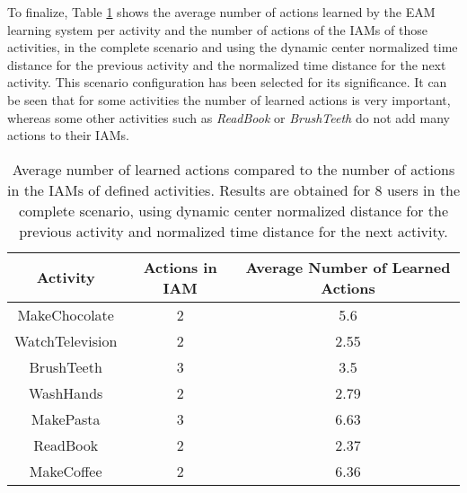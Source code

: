 To finalize, Table \ref{tab-avg-actions-comp-t2} shows the average number of actions learned by the EAM learning system per activity and the number of actions of the IAMs of those activities, in the complete scenario and using the dynamic center normalized time distance for the previous activity and the normalized time distance for the next activity. This scenario configuration has been selected for its significance. It can be seen that for some activities the number of learned actions is very important, whereas some other activities such as \textit{ReadBook} or \textit{BrushTeeth} do not add many actions to their IAMs.

\begin{table}[htbp]\scriptsize
  \begin{center}
        \begin{tabular}{ccc}
            \hline            
            \textbf{Activity} & \textbf{Actions in IAM} & \textbf{Average Number of Learned Actions} \\             
            \hline
            MakeChocolate   & 2 & 5.6 \\
	    WatchTelevision & 2 & 2.55 \\
	    BrushTeeth      & 3 & 3.5 \\
	    WashHands       & 2 & 2.79 \\
	    MakePasta       & 3 & 6.63 \\
	    ReadBook        & 2 & 2.37 \\
	    MakeCoffee      & 2 & 6.36 \\
            \hline
        \end{tabular}                
        \caption{Average number of learned actions compared to the number of actions in the IAMs of defined activities. Results are obtained for 8 users in the complete scenario, using dynamic center normalized distance for the previous activity and normalized time distance for the next activity.}
        \label{tab-avg-actions-comp-t2}
    \end{center}
\end{table}